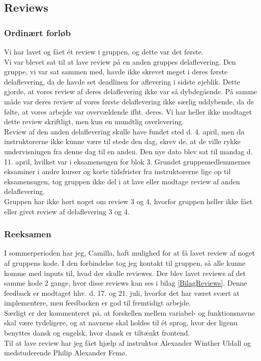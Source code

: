 \documentclass[]{article}
\begin{document}
\subsection{Reviews} \label{Reviews}
\subsubsection*{Ordinært forløb}
\noindent Vi har lavet og fået ét review i gruppen, og dette var det første. \\
Vi var blevet sat til at lave review på en anden gruppes delaflevering. Den gruppe, vi var sat sammen med, havde ikke skrevet meget i deres første delaflevering, da de havde set deadlinen for aflevering i sidste øjeblik. Dette gjorde, at vores review af deres delaflevering ikke var så dybdegående. På samme måde var deres review af vores første delaflevering ikke særlig uddybende, da de følte, at vores arbejde var overvældende ifht. deres. Vi har heller ikke modtaget dette review skriftligt, men kun en mundtlig overlevering. \\
Review af den anden delaflevering skulle have fundet sted d. 4. april, men da instruktorerne ikke kunne være til stede den dag, skrev de, at de ville rykke undervisningen fra denne dag til en anden. Den nye dato blev sat til mandag d. 11. april, hvilket var i eksamensugen for blok 3. Grundet gruppemedlemmernes eksaminer i andre kurser og korte tidsfrister fra instruktorerne lige op til eksamensugen, tog gruppen ikke del i at lave eller modtage review af anden delaflevering. \\
Gruppen har ikke hørt noget om review 3 og 4, hvorfor gruppen heller ikke fået eller givet review af delaflevering 3 og 4.
\subsubsection*{Reeksamen}
\noindent I sommerperioden har jeg, Camilla, haft mulighed for at få lavet review af noget af gruppens kode. I den forbindelse tog jeg kontakt til gruppen, så alle kunne komme med inputs til, hvad der skulle reviewes. Der blev lavet reviews af det samme kode 2 gange, hvor disse reviews kan ses i bilag \ref{BilagReviews}. Denne feedback er modtaget hhv. d. 17. og 21. juli, hvorfor det har været svært at implementere, men feedbacken er god til fremtidigt arbejde. \\
Særligt er der kommenteret på, at forskellen mellem variabel- og funktionsnavne skal være tydeligere, og at navnene skal holdes til ét sprog, hvor der ligenu benyttes dansk og engelsk, hvor dansk er tiltænkt frontend. \\
Til at lave review har jeg fået hjælp af instruktor Alexander Winther Uldall og medstuderende Philip Alexander Femø.
\end{document}
